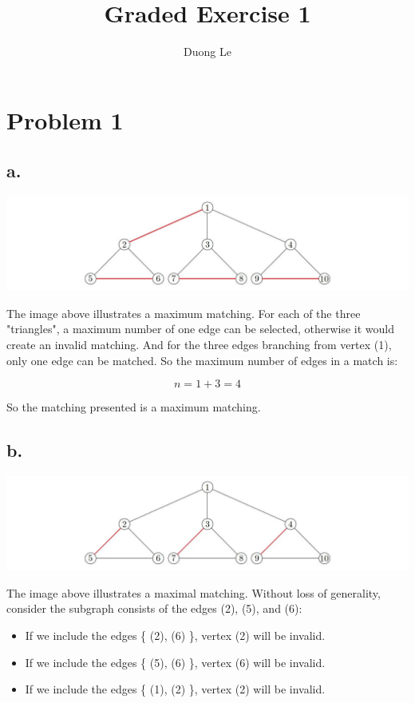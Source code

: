 \documentclass{article}
\title{Graded Exercise 1}
\author{Duong Le}
\date{}
\begin{document}
\maketitle


\section*{Problem 1}
\subsection*{a.}

\includegraphics[scale = 0.45]{1a}

The image above illustrates a maximum matching. For each of the three "triangles", a maximum number of one edge can be selected, otherwise it would create an invalid matching. And for the three edges branching from vertex (1), only one edge can be matched. So the maximum number of edges in a match is:

\[ n = 1 + 3 = 4 \]

So the matching presented is a maximum matching.
\pagebreak

\subsection*{b.}

\includegraphics[scale = 0.45]{1b}

The image above illustrates a maximal matching. Without loss of generality, consider the subgraph consists of the edges (2), (5), and (6):

\begin{itemize}
    \item If we include the edges \{ (2), (6) \}, vertex (2) will be invalid.
    \item If we include the edges \{ (5), (6) \}, vertex (6) will be invalid.
    \item If we include the edges \{ (1), (2) \}, vertex (2) will be invalid.
\end{itemize}	
\end{document}
